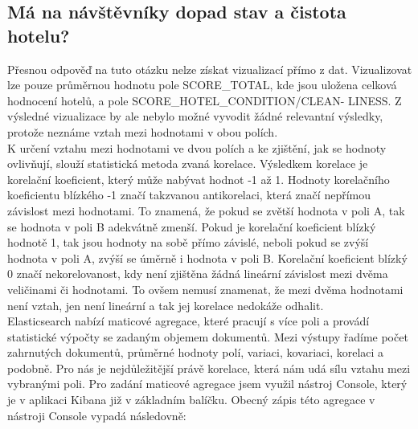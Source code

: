 \documentclass[czech,BP]{thesiskiv}
\begin{document}
\subsection{Má na návštěvníky dopad stav a čistota hotelu?}
Přesnou odpověď na tuto otázku nelze získat vizualizací přímo z dat. Vizualizovat lze pouze průměrnou hodnotu pole SCORE\_TOTAL, kde jsou uložena celková hodnocení hotelů, a pole SCORE\_HOTEL\_CONDITION/CLEAN- LINESS. Z výsledné vizualizace by ale nebylo možné vyvodit žádné relevantní výsledky, protože neznáme vztah mezi hodnotami v obou polích.
\\
K určení vztahu mezi hodnotami ve dvou polích a ke zjištění, jak se hodnoty ovlivňují, slouží statistická metoda zvaná korelace. Výsledkem korelace je korelační koeficient, který může nabývat hodnot -1 až 1. Hodnoty korelačního koeficientu blízkého -1 značí takzvanou antikorelaci, která značí nepřímou závislost mezi hodnotami. To znamená, že pokud se zvětší hodnota v poli A, tak se hodnota v poli B adekvátně zmenší. Pokud je korelační koeficient blízký hodnotě 1, tak jsou hodnoty na sobě přímo závislé, neboli pokud se zvýší hodnota v poli A, zvýší se úměrně i hodnota v poli B. Korelační koeficient blízký 0 značí nekorelovanost, kdy není zjištěna žádná lineární závislost mezi dvěma veličinami či hodnotami. To ovšem nemusí znamenat, že mezi dvěma hodnotami není vztah, jen není lineární a tak jej korelace nedokáže odhalit.\cite{Korelace}
\\
Elasticsearch nabízí maticové agregace, které pracují s více poli a provádí statistické výpočty se zadaným objemem dokumentů. Mezi výstupy řadíme počet zahrnutých dokumentů, průměrné hodnoty polí, variaci, kovariaci, korelaci a podobně. Pro nás je nejdůležitější právě korelace, která nám udá sílu vztahu mezi vybranými poli.\cite{MatrixAggs}
Pro zadání maticové agregace jsem využil nástroj Console, který je v aplikaci Kibana již v základním balíčku. Obecný zápis této agregace v nástroji Console vypadá následovně:
\end{document}
